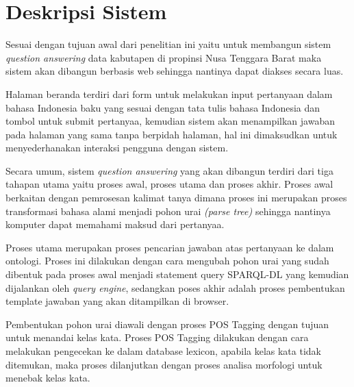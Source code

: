 \section{Deskripsi Sistem}
Sesuai dengan tujuan awal dari penelitian ini yaitu untuk membangun sistem \emph{question answering} data kabutapen di propinsi Nusa Tenggara Barat maka sistem akan dibangun berbasis web sehingga nantinya dapat diakses secara luas.

Halaman beranda terdiri dari form untuk melakukan input pertanyaan dalam bahasa Indonesia baku yang sesuai dengan tata tulis bahasa Indonesia dan tombol untuk submit pertanyaa, kemudian sistem akan menampilkan jawaban pada halaman yang sama tanpa berpidah halaman, hal ini dimaksudkan untuk menyederhanakan interaksi pengguna dengan sistem. 

Secara umum, sistem \emph{question answering} yang akan dibangun terdiri dari tiga tahapan utama yaitu proses awal, proses utama dan proses akhir. Proses awal berkaitan dengan pemrosesan kalimat tanya dimana proses ini merupakan proses transformasi bahasa alami menjadi pohon urai \emph{(parse tree)} sehingga nantinya komputer dapat memahami maksud dari pertanyaa.

Proses utama merupakan proses pencarian jawaban atas pertanyaan ke dalam ontologi. Proses ini dilakukan dengan cara mengubah pohon urai yang sudah dibentuk pada proses awal menjadi statement query SPARQL-DL yang kemudian dijalankan oleh \emph{query engine}, sedangkan poses akhir adalah proses pembentukan template jawaban yang akan ditampilkan di browser.

Pembentukan pohon urai diawali dengan proses POS Tagging dengan tujuan untuk menandai kelas kata. Proses POS Tagging dilakukan dengan cara melakukan pengecekan ke dalam database lexicon, apabila kelas kata tidak ditemukan, maka proses dilanjutkan dengan proses analisa morfologi untuk menebak kelas kata.

